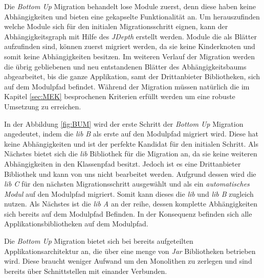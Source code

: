 	Die \textit{Bottom Up} Migration behandelt lose Module zuerst, denn diese haben keine Abhängigkeiten und bieten eine gekapselte Funktionalität an. Um herauszufinden welche Module sich für den initialen Migrationsschritt eignen, kann der Abhängigkeitsgraph mit Hilfe des \textit{JDepth} erstellt werden. Module die als Blätter aufzufinden sind, können zuerst migriert werden, da sie keine Kinderknoten und somit keine Abhängigkeiten besitzen. Im weiteren Verlauf der Migration werden die übrig gebliebenen und neu entstandenen Blätter des Abhängigkeitsbaums abgearbeitet, bis die ganze Applikation, samt der Drittanbieter Bibliotheken, sich auf dem Modulpfad befindet. Während der Migration müssen natürlich die im Kapitel \ref{sec:MEK} besprochenen Kriterien erfüllt werden um eine robuste Umsetzung zu erreichen.\bigbreak


	In der Abbildung \ref{fig:BUM} wird der erste Schritt der \textit{Bottom Up} Migration angedeutet, indem die \textit{lib B} als erste auf den Modulpfad migriert wird. Diese hat keine Abhängigkeiten und ist der perfekte Kandidat für den initialen Schritt. Als Nächstes bietet sich die \textit{lib} Bibliothek für die Migration an, da sie keine weiteren Abhängigkeiten in den Klassenpfad besitzt. Jedoch ist es eine Drittanbieter Bibliothek und kann von uns nicht bearbeitet werden. Aufgrund dessen wird die \textit{lib C} für  den nächsten Migrationsschritt ausgewählt und als ein \textit{automatisches Modul} auf den Modulpfad migriert. Somit kann dieses die \textit{lib} und \textit{lib B} zugleich nutzen. Als Nächstes ist die \textit{lib A} an der reihe, dessen komplette Abhängigkeiten sich bereits auf dem Modulpfad Befinden. In der Konsequenz befinden sich alle Applikationsbibliotheken auf dem Modulpfad. \bigbreak

	Die \textit{Bottom Up} Migration bietet sich bei bereits aufgeteilten Applikationsarchitektur an, die über eine menge von \textit{Jar} Bibliotheken betrieben wird. Diese braucht weniger Aufwand um den Monolithen zu zerlegen und sind bereits über Schnittstellen mit einander Verbunden.  








